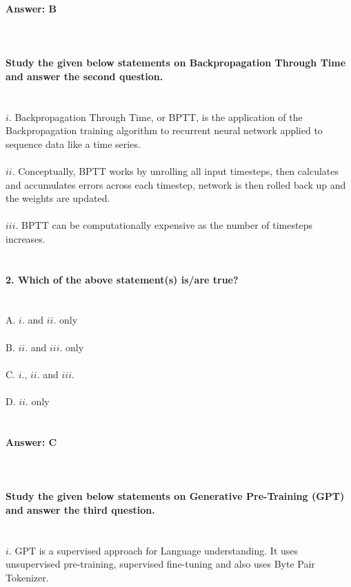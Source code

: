 \documentclass[prl,twocolumn,showpacs,preprintnumbers,superscriptaddress]{revtex4}
\theoremstyle{plain}
\theoremstyle{definition}
\begin{document}
\begin{widetext}
\\
\\
\\
\textbf{Answer: B}
\\
\\
\\
\\
\textbf{Study the given below statements on Backpropagation Through Time and answer the second question.}
\\
\\
\\
$i.$ Backpropagation Through Time, or BPTT, is the application of the Backpropagation training algorithm to recurrent neural network applied to sequence data like a time series.
\\
\\
$ii.$ Conceptually, BPTT works by unrolling all input timesteps, then calculates and accumulates errors across each timestep, network is then rolled back up and the weights are updated.
\\
\\
$iii.$ BPTT can be computationally expensive as the number of timesteps increases.
\\
\\
\\
\textbf{2. Which of the above statement(s) is/are true?}
\\
\\
\\
\noindent A. $i.$ and $ii.$ only
\\
\\
B. $ii.$ and $iii.$ only 
\\
\\
C. $i.$, $ii.$ and $iii.$
\\
\\
D. $ii.$ only
\\
\\
\\
\textbf{Answer: C}
\\
\\
\\
\\
\textbf{Study the given below statements on Generative Pre-Training (GPT) and answer the third question.}
\\
\\
\\
$i.$ GPT is a supervised approach for Language understanding. It uses unsupervised pre-training, supervised fine-tuning and also uses Byte Pair Tokenizer.
\\
\\

\end{widetext}
\end{document}
